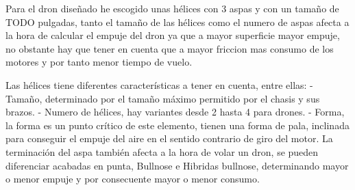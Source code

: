 
                Para el dron diseñado he escogido unas hélices con 3 aspas y con un tamaño de TODO pulgadas, tanto el tamaño de las hélices como el numero de aspas afecta a la hora de calcular el empuje del dron ya que a mayor superficie mayor empuje, no obstante hay que tener en cuenta que a mayor friccion mas consumo de los motores y por tanto menor tiempo de vuelo.
                
                Las hélices tiene diferentes características a tener en cuenta, entre ellas:
                    - Tamaño, determinado por el tamaño máximo permitido por el chasis y sus brazos.
                    - Numero de hélices, hay variantes desde 2 hasta 4 para drones.
                    - Forma, la forma es un punto crítico de este elemento, tienen una forma de pala, inclinada para conseguir el empuje del aire en el sentido contrario de giro del motor. La terminación del aspa también afecta a la hora de volar un dron, se pueden diferenciar acabadas en punta,  Bullnose e Hibridas bullnose, determinando mayor o menor empuje y por consecuente mayor o menor consumo.